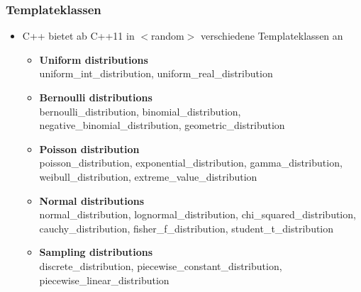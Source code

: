 \subsubsection{Templateklassen}
\begin{itemize}
	\item C++ bietet ab C++11 in $<$random$>$ verschiedene Templateklassen an
	\begin{itemize}
		\item \textbf{Uniform distributions}\\ uniform\_int\_distribution, uniform\_real\_distribution
		\item \textbf{Bernoulli distributions}\\ bernoulli\_distribution, binomial\_distribution, negative\_binomial\_distribution, geometric\_distribution
		\item \textbf{Poisson distribution}\\ poisson\_distribution, exponential\_distribution, gamma\_distribution, weibull\_distribution, extreme\_value\_distribution
		\item \textbf{Normal distributions}\\ normal\_distribution, lognormal\_distribution, chi\_squared\_distribution, cauchy\_distribution, fisher\_f\_distribution, student\_t\_distribution
		\item \textbf{Sampling distributions}\\ discrete\_distribution, piecewise\_constant\_distribution, piecewise\_linear\_distribution
	\end{itemize}
\end{itemize}
